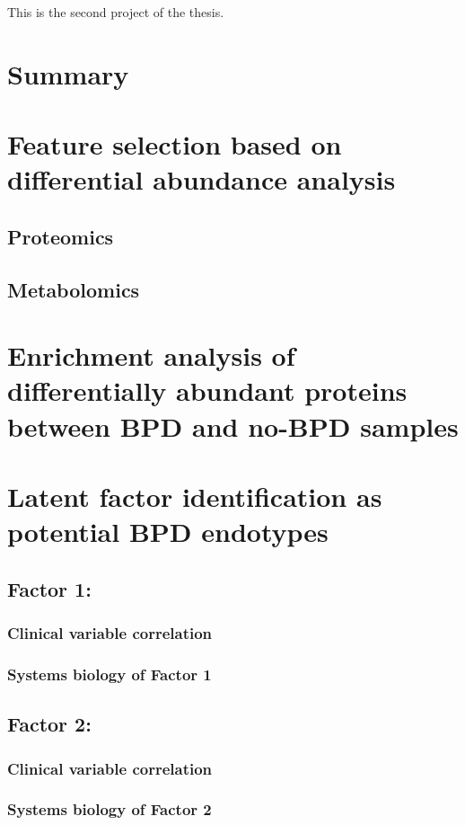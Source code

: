 This is the second project of the thesis.

\section{Summary}

\section{Feature selection based on differential abundance analysis}
    \subsection{Proteomics}
    \subsection{Metabolomics}

\section{Enrichment analysis of differentially abundant proteins between BPD and no-BPD samples}

\section{Latent factor identification as potential BPD endotypes}
    \subsection{Factor 1: }
        \subsubsection{Clinical variable correlation}
        \subsubsection{Systems biology of Factor 1}
    \subsection{Factor 2: }
        \subsubsection{Clinical variable correlation}
        \subsubsection{Systems biology of Factor 2}
